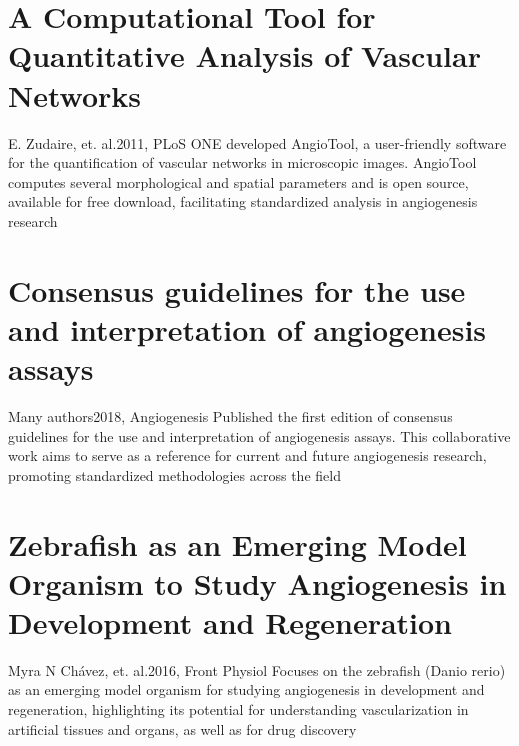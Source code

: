 \section{A Computational Tool for Quantitative Analysis of Vascular Networks}{E. Zudaire, et. al.}{2011, PLoS ONE}
developed AngioTool, a user-friendly software for the quantification of vascular networks in microscopic images. AngioTool computes several morphological and spatial parameters and is open source, available for free download, facilitating standardized analysis in angiogenesis research \cite{Zudaire2011}

\section{Consensus guidelines for the use and interpretation of angiogenesis assays}{Many authors}{2018, Angiogenesis}
Published the first edition of consensus guidelines for the use and interpretation of angiogenesis assays. This collaborative work aims to serve as a reference for current and future angiogenesis research, promoting standardized methodologies across the field \cite{NowakSliwinska2018a}

\section{Zebrafish as an Emerging Model Organism to Study Angiogenesis in Development and Regeneration}{Myra N Chávez, et. al.}{2016, Front Physiol}
Focuses on the zebrafish (Danio rerio) as an emerging model organism for studying angiogenesis in development and regeneration, highlighting its potential for understanding vascularization in artificial tissues and organs, as well as for drug discovery \cite{Chavez2016}




	
	
	

\let\section\oldsection
